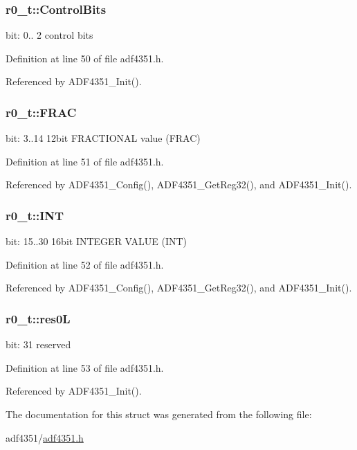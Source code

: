 \subsubsection[{\texorpdfstring{Control\+Bits}{ControlBits}}]{ r0\+\_\+t\+::\+Control\+Bits}\hypertarget{structr0__t_aad2911768ed7dd38e899b81d517dda08}{}\label{structr0__t_aad2911768ed7dd38e899b81d517dda08}
bit\+: 0.. 2 control bits 

Definition at line 50 of file adf4351.\+h.



Referenced by A\+D\+F4351\+\_\+\+Init().

\subsubsection[{\texorpdfstring{F\+R\+AC}{FRAC}}]{ r0\+\_\+t\+::\+F\+R\+AC}\hypertarget{structr0__t_adc22c0b86ef296065f01c8800d4f5d52}{}\label{structr0__t_adc22c0b86ef296065f01c8800d4f5d52}
bit\+: 3..14 12bit F\+R\+A\+C\+T\+I\+O\+N\+AL value (F\+R\+AC) 

Definition at line 51 of file adf4351.\+h.



Referenced by A\+D\+F4351\+\_\+\+Config(), A\+D\+F4351\+\_\+\+Get\+Reg32(), and A\+D\+F4351\+\_\+\+Init().

\subsubsection[{\texorpdfstring{I\+NT}{INT}}]{ r0\+\_\+t\+::\+I\+NT}\hypertarget{structr0__t_a1d7f06769cdf259c9858033cb164e31d}{}\label{structr0__t_a1d7f06769cdf259c9858033cb164e31d}
bit\+: 15..30 16bit I\+N\+T\+E\+G\+ER V\+A\+L\+UE (I\+NT) 

Definition at line 52 of file adf4351.\+h.



Referenced by A\+D\+F4351\+\_\+\+Config(), A\+D\+F4351\+\_\+\+Get\+Reg32(), and A\+D\+F4351\+\_\+\+Init().

\subsubsection[{\texorpdfstring{res0L}{res0L}}]{ r0\+\_\+t\+::res0L}\hypertarget{structr0__t_ab7402e75c2a633ce378078407151341d}{}\label{structr0__t_ab7402e75c2a633ce378078407151341d}
bit\+: 31 reserved 

Definition at line 53 of file adf4351.\+h.



Referenced by A\+D\+F4351\+\_\+\+Init().



The documentation for this struct was generated from the following file\+:\begin{DoxyCompactItemize}
\item 
adf4351/\hyperlink{adf4351_8h}{adf4351.\+h}\end{DoxyCompactItemize}
